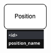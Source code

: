 \documentclass{Configuration_Files/PoliMi3i_thesis}
\begin{document}
\begin{figure}[htbp]
\begin{subfigure}[b]{0.2\linewidth}
    \includegraphics[width=\linewidth]{Project Template/Images/entities/position.drawio.png}
  \end{subfigure}
  \hfill
  \begin{subfigure}[b]{0.12\linewidth}

\end{subfigure}
\end{figure}
\end{document}
